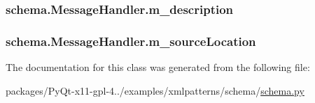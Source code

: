 \subsubsection[{m\+\_\+description}]{\setlength{\rightskip}{0pt plus 5cm}schema.\+Message\+Handler.\+m\+\_\+description}\label{classschema_1_1MessageHandler_a451825118baa647d88023434d61729c9}
\hypertarget{classschema_1_1MessageHandler_a65fd43d06ef585b9922da829d64c87af}{}
\subsubsection[{m\+\_\+source\+Location}]{\setlength{\rightskip}{0pt plus 5cm}schema.\+Message\+Handler.\+m\+\_\+source\+Location}\label{classschema_1_1MessageHandler_a65fd43d06ef585b9922da829d64c87af}


The documentation for this class was generated from the following file\+:\begin{DoxyCompactItemize}
\item 
packages/\+Py\+Qt-\/x11-\/gpl-\/4../examples/xmlpatterns/schema/\hyperlink{schema_8py}{schema.\+py}\end{DoxyCompactItemize}
